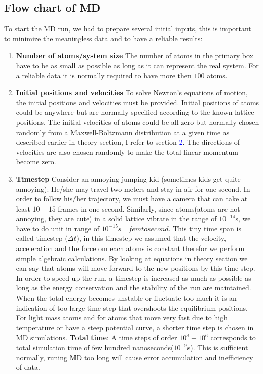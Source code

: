 \documentclass[a4paper]{article}
\begin{document}
\subsection{Flow chart of MD}
To start the MD run, we had to prepare several initial inputs, this is important to minimize the meaningless data and to have a reliable results:
\begin{enumerate}
\item \textbf{Number of atoms/system size} The number of atoms in the primary box have to be as small as possible as long as it can represent the real system. For a reliable data it is normally required to have more then $100$ atoms. 
\item \textbf{Initial positions and velocities} To solve Newton's equations of motion, the initial positions and velocities must be provided. Initial positions of atoms could be anywhere but are normally specified according to the known lattice positions. The initial velocities of atoms could be all zero but normally chosen randomly from a Maxwell-Boltzmann distribution at a given time as described earlier in theory section, I refer to section \textcolor{blue}{2}. The directions of velocities are also chosen randomly to make the total linear momentum become zero. 
\item \textbf{Timestep} Consider an annoying jumping kid (sometimes kids get quite annoying): He/she may travel two meters and stay in air for one second. In order to follow his/her trajectory, we must have a camera that can take at least $10-15$ frames in one second. Similarly, since atoms(atoms are not annoying, they are cute) in a solid lattice vibrate in the range of $10^{-14}$s, we have to do unit in range of $10^{-15}s \quad femtosecond$. This tiny time span is called timestep ($\Delta t$), in this timestep we assumed that the velocity, acceleration and the force om each atoms is constant therefor we perform simple algebraic calculations. By looking at equations in theory section we can say that atoms will move forward to the new positions by this time step. In order to speed up the run, a timestep is increased as much as possible as long as the energy conservation and the stability of the run are maintained. When the total energy becomes unstable or fluctuate too much it is an indication of too large time step that overshoots the equilibrium positions. For light mass atoms and for atoms that move very fast due to high temperature or have a steep potential curve, a shorter time step is chosen in MD simulations. \textbf{Total time}: A time steps of order $10^3-10^6$ corresponds to total simulation time of few hundred nanoseconds($10^{-9}$s). This is sufficient normally, runing MD too long will cause error accumulation and inefficiency of data. 


\end{enumerate}
\end{document}
